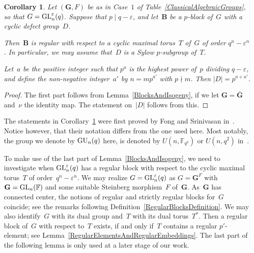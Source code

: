 \documentclass[12pt]{amsart}
\newcommand{\bG}{{\mathbf{G}}}      %
\newcommand{\bB}{{\mathbf{B}}}
\def\GL{ \text{\rm GL} }
\def\GU{ \text{\rm GU} }
\newtheorem{cor}[thm]{Corollary}
\theoremstyle{theorem}
\theoremstyle{definition}
\theoremstyle{remark}
\begin{document}
\begin{cor}
\label{GLnCor}
Let $(\bG,F)$ be as in {\rm Case~$1$} of 
{\rm Table~\ref{ClassicalAlgebraicGroups}},
so that $G = \GL_n^{\varepsilon}(q)$. Suppose that $p \mid q - \varepsilon$,
and let~$\bB$ be a $p$-block of~$G$ with a cyclic defect group~$D$.

Then~$\bB$ is regular with respect to a cyclic maximal torus~$T$ of~$G$ of order
$q^n - \varepsilon^n$. In particular, we may assume that~$D$ is a Sylow
$p$-subgroup of~$T$. 

Let~$a$ be the positive integer such that $p^a$ is the highest power of~$p$
dividing $q - \varepsilon$, and define the non-negative integer~$a'$ by 
$n = m p^{a'}$ with $p \nmid m$. Then $|D| = p^{a+a'}$.
\end{cor}
\begin{proof}
The first part follows from Lemma~\ref{BlocksAndIsogeny}, if we let
$\bG = \bar{\bG}$ and~$\nu$ the identity map. The statement on~$|D|$ follows 
from this.
\end{proof}

The statements in Corollary~\ref{GLnCor} were first proved by Fong and 
Srinivasan in~\cite{fs2}. Notice however, that their notation differs from the 
one used here. Most notably, the group we denote by $\GU_n( q )$ here, is 
denoted by $U(n, \mathbb{F}_{q^2} )$ or $U(n,q^2)$ in~\cite{fs2}. 

To make use of the last part of Lemma~\ref{BlocksAndIsogeny}, we need to 
investigate when $\GL_n^{\varepsilon}(q)$ has a regular block with respect to
the cyclic maximal torus~$T$ of order~$q^n - \varepsilon^n$. We may realize
$G = \GL_n^{\varepsilon}(q)$ as $G = \bG^F$ with $\bG = \GL_n( \mathbb{F} )$ 
and some suitable Steinberg morphism~$F$ of~$\bG$. As~$\bG$ has connected 
center, the notions of regular and strictly regular blocks for~$G$ coincide; see 
the remarks following Definition~\ref{RegularBlocksDefinition}. We may also 
identify~$G$ with its dual group and~$T$ with its dual torus~$T^*$. Then a 
regular block of~$G$ with respect to~$T$ exists, if and only if~$T$ contains a 
regular $p'$-element; see Lemma~\ref{RegularElementsAndRegularEmbeddings}.
The last part of the following lemma is only used at a later stage of our work.
\end{document}
